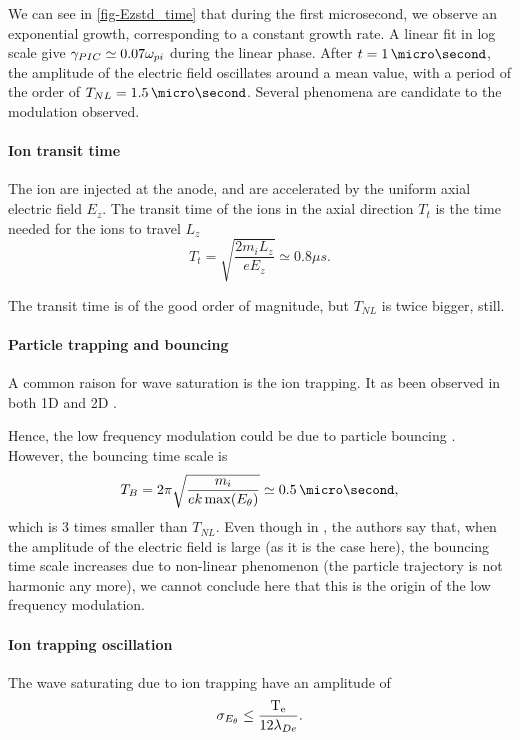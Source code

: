   We can see in \cref{fig-Ezstd_time} that during the first microsecond, we observe an exponential growth, corresponding to a constant growth rate.
  A linear fit in log scale give $\gamma_{PIC} \simeq 0.07 \omega_{pi}$ during the linear phase.
  After $t=1\,\micro\second$, the amplitude of the electric field oscillates around a mean value, with a period of the order of $T_{NL}=1.5 \,\micro\second$.
  Several phenomena are candidate to the modulation observed.
  
  
  \paragraph{Ion transit time\\}
    The ion are injected at the anode, and are accelerated by the uniform axial electric field $E_z$.
    The transit time of the ions in the axial direction $T_t$  is the time needed for the ions to travel $L_z$
    \begin{equation} \label{eq-transittime}
      T_{t} = \sqrt{\frac{2 m_i L_z}{e E_z}} \simeq 0.8 \mu s.
    \end{equation}
    
    The transit time is of the good  order of magnitude, but $T_{NL}$ is twice bigger, still.
    
  \paragraph{Particle trapping and bouncing\\}
    A common raison for wave saturation is the ion trapping. 
    It as been observed in both \ac{1D} \citet{lafleur2016a} and \ac{2D} \citep{croes2017a}.
    
    Hence, the low frequency modulation could be due to particle bouncing \citep{belmont2013}.
    However, the bouncing time scale is 
    \begin{equation} \label{eq-TB}
      T_{B} = 2 \pi \sqrt{\frac{m_i}{e k \max(E_{\theta})} } \simeq 0.5 \,\micro\second,
    \end{equation}
    which is 3 times smaller than $T_{NL}$.
    Even though in \citet{belmont2013}, the authors say that, when the amplitude of the electric field is large (as it is the case here), the bouncing time scale increases due to non-linear phenomenon (the particle trajectory is not harmonic any more), we cannot conclude here that this is the origin of the low frequency modulation.

  
  \paragraph{Ion trapping oscillation\\}
    The wave saturating due to ion trapping have an amplitude of \citep{boeuf2018}
     \begin{equation} \label{eq-iontropempl}
       \sigma_{E_{\theta}} \leq \frac{\mathrm{T_e}}{12 \lambda_{De}}.
     \end{equation}
    
